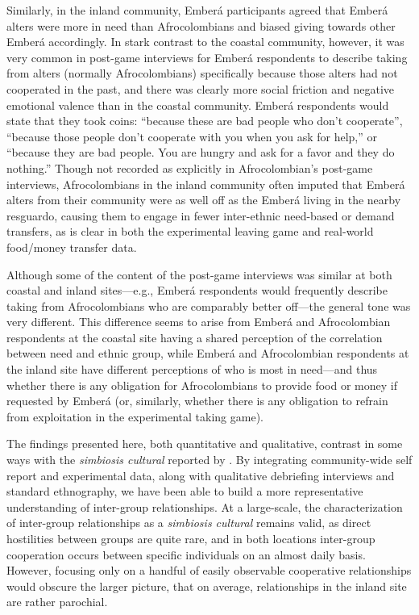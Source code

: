 \documentclass[bibauthoryear]{aa}
\begin{document}
Similarly, in the inland community, Ember\'a participants agreed that Ember\'a alters were more in need than Afrocolombians and biased giving towards other Ember\'a accordingly. In stark contrast to the coastal community, however, it was very common in post-game interviews for Ember\'a respondents to describe taking from alters (normally Afrocolombians) specifically because those alters had not cooperated in the past, and there was clearly more social friction and negative emotional valence than in the coastal community. Ember\'a respondents would state that they took coins: ``because these  are bad people  who don't cooperate'', ``because those people don't cooperate with you when you ask for help,'' or ``because they are bad people. You are hungry and ask for a favor and they do nothing.'' Though not recorded as explicitly in Afrocolombian's post-game interviews,  Afrocolombians in the inland community often imputed that Ember\'a alters from their community were as well off as the Ember\'a living in the nearby resguardo, causing them to engage in fewer inter-ethnic need-based or demand transfers, as is clear in both the experimental leaving game and real-world food/money transfer data.

Although some of the content of the post-game interviews was similar at both coastal and inland sites---e.g., Ember\'a respondents would frequently describe taking from Afrocolombians who are comparably better off---the general tone was very different. This difference seems to arise from Ember\'a and Afrocolombian respondents at the coastal site having a shared perception of the correlation between need and ethnic group, while Ember\'a and Afrocolombian respondents at the inland site have different perceptions of who is most in need---and thus whether there is any obligation for Afrocolombians to provide food or money if requested by Ember\'a (or, similarly, whether there is any obligation to refrain from exploitation in the experimental taking game).  

The findings presented here, both quantitative and qualitative, contrast in some ways with the \textit{simbiosis cultural} reported by \citet{Cay73}. By integrating community-wide self report and experimental data, along with qualitative debriefing interviews and standard ethnography, we have been able to build
a more representative understanding of inter-group relationships. At a large-scale, the characterization of inter-group relationships as a \textit{simbiosis cultural} remains valid, as direct hostilities between groups are quite rare, and in both locations inter-group cooperation occurs between specific individuals on an almost daily basis. However, focusing only on a handful of easily observable cooperative relationships would obscure the larger picture, that on average, relationships in the inland site are rather parochial.
  
\end{document}
